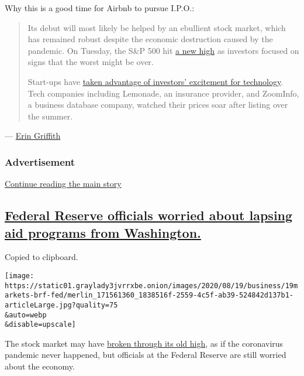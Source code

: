 Why this is a good time for Airbnb to pursue I.P.O.:

\begin{quote}
Its debut will most likely be helped by an ebullient stock market, which
has remained robust despite the economic destruction caused by the
pandemic. On Tuesday, the S\&P 500 hit
\href{https://www.nytimes3xbfgragh.onion/2020/08/18/business/stock-market-record.html?action=click\&module=Top\%20Stories\&pgtype=Homepage}{a
new high} as investors focused on signs that the worst might be over.

Start-ups have
\href{https://www.nytimes3xbfgragh.onion/2020/06/17/technology/ipo-pandemic.html}{taken
advantage of investors' excitement for technology}. Tech companies
including Lemonade, an insurance provider, and ZoomInfo, a business
database company, watched their prices soar after listing over the
summer.
\end{quote}

--- \href{https://www.nytimes3xbfgragh.onion/by/erin-griffith}{Erin
Griffith}

\hypertarget{advertisement}{%
\subsubsection{Advertisement}\label{advertisement}}

\protect\hyperlink{after-dfp-ad-mid1}{Continue reading the main story}

\hypertarget{federal-reserve-officials-worried-about-lapsing-aid-programs-from-washington}{%
\subsection{\texorpdfstring{\protect\hyperlink{federal-reserve-officials-worried-about-lapsing-aid-programs-from-washington}{Federal
Reserve officials worried about lapsing aid programs from
Washington.}}{Federal Reserve officials worried about lapsing aid programs from Washington.}}\label{federal-reserve-officials-worried-about-lapsing-aid-programs-from-washington}}

Copied to clipboard.

\texttt{[image: https://static01.graylady3jvrrxbe.onion/images/2020/08/19/business/19markets-brf-fed/merlin\_171561360\_1838516f-2559-4c5f-ab39-524842d137b1-articleLarge.jpg?quality=75\\\&auto=webp\\\&disable=upscale]}

The stock market may have
\href{https://www.nytimes3xbfgragh.onion/2020/08/18/business/stock-market-record.html}{broken
through its old high}, as if the coronavirus pandemic never happened,
but officials at the Federal Reserve are still worried about the
economy.


